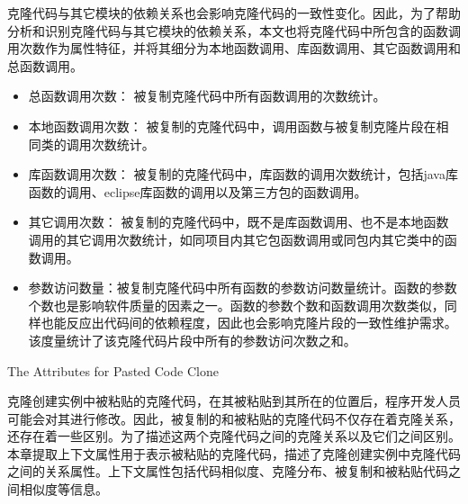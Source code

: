 克隆代码与其它模块的依赖关系也会影响克隆代码的一致性变化。因此，为了帮助分析和识别克隆代码与其它模块的依赖关系，本文也将克隆代码中所包含的函数调用次数作为属性特征，并将其细分为本地函数调用、库函数调用、其它函数调用和总函数调用。

\begin{itemize}
\item  
总函数调用次数：
被复制克隆代码中所有函数调用的次数统计。
\item  
本地函数调用次数：
被复制的克隆代码中，调用函数与被复制克隆片段在相同类的调用次数统计。
\item  
库函数调用次数：
被复制的克隆代码中，库函数的调用次数统计，包括java库函数的调用、eclipse库函数的调用以及第三方包的函数调用。
\item  
其它调用次数：
被复制的克隆代码中，既不是库函数调用、也不是本地函数调用的其它调用次数统计，如同项目内其它包函数调用或同包内其它类中的函数调用。
\item  
参数访问数量：被复制克隆代码中所有函数的参数访问数量统计。函数的参数个数也是影响软件质量的因素之一。函数的参数个数和函数调用次数类似，同样也能反应出代码间的依赖程度，因此也会影响克隆片段的一致性维护需求。该度量统计了该克隆代码片段中所有的参数访问次数之和。
\end{itemize}

{The Attributes for Pasted Code Clone}

克隆创建实例中被粘贴的克隆代码，在其被粘贴到其所在的位置后，程序开发人员可能会对其进行修改。因此，被复制的和被粘贴的克隆代码不仅存在着克隆关系，还存在着一些区别。为了描述这两个克隆代码之间的克隆关系以及它们之间区别。本章提取上下文属性用于表示被粘贴的克隆代码，描述了克隆创建实例中克隆代码之间的关系属性。上下文属性包括代码相似度、克隆分布、被复制和被粘贴代码之间相似度等信息。

